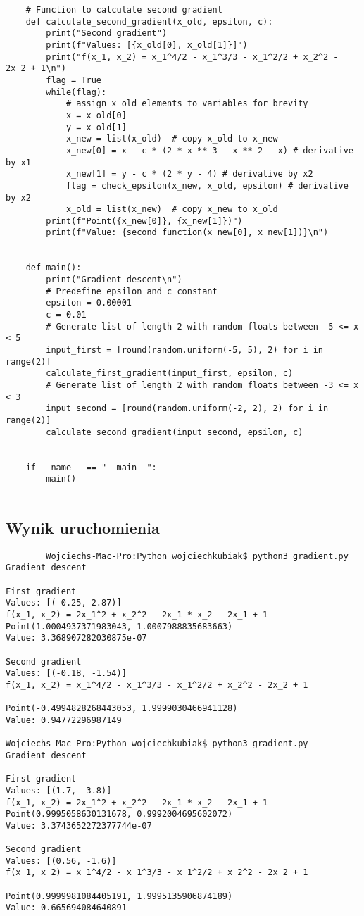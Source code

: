 \documentclass[11pt]{article}
\begin{document}
\begin{lstlisting}
    # Function to calculate second gradient
    def calculate_second_gradient(x_old, epsilon, c):
        print("Second gradient")
        print(f"Values: [{x_old[0], x_old[1]}]")
        print("f(x_1, x_2) = x_1^4/2 - x_1^3/3 - x_1^2/2 + x_2^2 - 2x_2 + 1\n")
        flag = True
        while(flag):
            # assign x_old elements to variables for brevity
            x = x_old[0]
            y = x_old[1]
            x_new = list(x_old)  # copy x_old to x_new
            x_new[0] = x - c * (2 * x ** 3 - x ** 2 - x) # derivative by x1
            x_new[1] = y - c * (2 * y - 4) # derivative by x2
            flag = check_epsilon(x_new, x_old, epsilon) # derivative by x2
            x_old = list(x_new)  # copy x_new to x_old
        print(f"Point({x_new[0]}, {x_new[1]})")
        print(f"Value: {second_function(x_new[0], x_new[1])}\n")
    
    
    def main():
        print("Gradient descent\n")
        # Predefine epsilon and c constant
        epsilon = 0.00001
        c = 0.01
        # Generate list of length 2 with random floats between -5 <= x < 5
        input_first = [round(random.uniform(-5, 5), 2) for i in range(2)]
        calculate_first_gradient(input_first, epsilon, c)
        # Generate list of length 2 with random floats between -3 <= x < 3
        input_second = [round(random.uniform(-2, 2), 2) for i in range(2)]
        calculate_second_gradient(input_second, epsilon, c)
    
    
    if __name__ == "__main__":
        main()
    
    \end{lstlisting}
    \subsection{Wynik uruchomienia}
    \begin{lstlisting}
        Wojciechs-Mac-Pro:Python wojciechkubiak$ python3 gradient.py 
Gradient descent

First gradient
Values: [(-0.25, 2.87)]
f(x_1, x_2) = 2x_1^2 + x_2^2 - 2x_1 * x_2 - 2x_1 + 1
Point(1.0004937371983043, 1.0007988835683663)
Value: 3.368907282030875e-07

Second gradient
Values: [(-0.18, -1.54)]
f(x_1, x_2) = x_1^4/2 - x_1^3/3 - x_1^2/2 + x_2^2 - 2x_2 + 1

Point(-0.4994828268443053, 1.9999030466941128)
Value: 0.94772296987149

Wojciechs-Mac-Pro:Python wojciechkubiak$ python3 gradient.py 
Gradient descent

First gradient
Values: [(1.7, -3.8)]
f(x_1, x_2) = 2x_1^2 + x_2^2 - 2x_1 * x_2 - 2x_1 + 1
Point(0.9995058630131678, 0.9992004695602072)
Value: 3.3743652272377744e-07

Second gradient
Values: [(0.56, -1.6)]
f(x_1, x_2) = x_1^4/2 - x_1^3/3 - x_1^2/2 + x_2^2 - 2x_2 + 1

Point(0.9999981084405191, 1.9995135906874189)
Value: 0.665694084640891
    \end{lstlisting}
\end{document}
